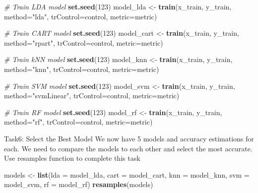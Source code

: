 \documentclass[
]{article}
\newenvironment{Shaded}{\begin{snugshade}}{\end{snugshade}}
\newcommand{\AttributeTok}[1]{\textcolor[rgb]{0.13,0.29,0.53}{#1}}
\newcommand{\CommentTok}[1]{\textcolor[rgb]{0.56,0.35,0.01}{\textit{#1}}}
\newcommand{\DecValTok}[1]{\textcolor[rgb]{0.00,0.00,0.81}{#1}}
\newcommand{\FunctionTok}[1]{\textcolor[rgb]{0.13,0.29,0.53}{\textbf{#1}}}
\newcommand{\NormalTok}[1]{#1}
\newcommand{\OtherTok}[1]{\textcolor[rgb]{0.56,0.35,0.01}{#1}}
\newcommand{\StringTok}[1]{\textcolor[rgb]{0.31,0.60,0.02}{#1}}
\begin{document}
\begin{Shaded}
\begin{Highlighting}[]
\CommentTok{\# Train LDA model}
\FunctionTok{set.seed}\NormalTok{(}\DecValTok{123}\NormalTok{)}
\NormalTok{model\_lda }\OtherTok{\textless{}{-}} \FunctionTok{train}\NormalTok{(x\_train, y\_train, }\AttributeTok{method=}\StringTok{"lda"}\NormalTok{, }\AttributeTok{trControl=}\NormalTok{control, }\AttributeTok{metric=}\NormalTok{metric)}

\CommentTok{\# Train CART model}
\FunctionTok{set.seed}\NormalTok{(}\DecValTok{123}\NormalTok{)}
\NormalTok{model\_cart }\OtherTok{\textless{}{-}} \FunctionTok{train}\NormalTok{(x\_train, y\_train, }\AttributeTok{method=}\StringTok{"rpart"}\NormalTok{, }\AttributeTok{trControl=}\NormalTok{control, }\AttributeTok{metric=}\NormalTok{metric)}

\CommentTok{\# Train kNN model}
\FunctionTok{set.seed}\NormalTok{(}\DecValTok{123}\NormalTok{)}
\NormalTok{model\_knn }\OtherTok{\textless{}{-}} \FunctionTok{train}\NormalTok{(x\_train, y\_train, }\AttributeTok{method=}\StringTok{"knn"}\NormalTok{, }\AttributeTok{trControl=}\NormalTok{control, }\AttributeTok{metric=}\NormalTok{metric)}

\CommentTok{\# Train SVM model}
\FunctionTok{set.seed}\NormalTok{(}\DecValTok{123}\NormalTok{)}
\NormalTok{model\_svm }\OtherTok{\textless{}{-}} \FunctionTok{train}\NormalTok{(x\_train, y\_train, }\AttributeTok{method=}\StringTok{"svmLinear"}\NormalTok{, }\AttributeTok{trControl=}\NormalTok{control, }\AttributeTok{metric=}\NormalTok{metric)}

\CommentTok{\# Train RF model}
\FunctionTok{set.seed}\NormalTok{(}\DecValTok{123}\NormalTok{)}
\NormalTok{model\_rf }\OtherTok{\textless{}{-}} \FunctionTok{train}\NormalTok{(x\_train, y\_train, }\AttributeTok{method=}\StringTok{"rf"}\NormalTok{, }\AttributeTok{trControl=}\NormalTok{control, }\AttributeTok{metric=}\NormalTok{metric)}
\end{Highlighting}
\end{Shaded}

Task6: Select the Best Model We now have 5 models and accuracy
estimations for each. We need to compare the models to each other and
select the most accurate. Use resamples function to complete this task

\begin{Shaded}
\begin{Highlighting}[]
\NormalTok{models }\OtherTok{\textless{}{-}} \FunctionTok{list}\NormalTok{(}\AttributeTok{lda =}\NormalTok{ model\_lda, }\AttributeTok{cart =}\NormalTok{ model\_cart, }\AttributeTok{knn =}\NormalTok{ model\_knn, }\AttributeTok{svm =}\NormalTok{ model\_svm, }\AttributeTok{rf =}\NormalTok{ model\_rf)}
\FunctionTok{resamples}\NormalTok{(models)}
\end{Highlighting}
\end{Shaded}
\end{document}
